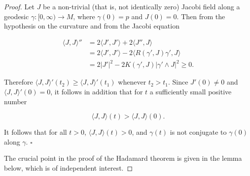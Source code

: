 \begin{proof}
  Let $J$ be a non-trivial (that is, not identically zero) Jacobi field
  along a geodesic $\gamma:[0,\infty)\to M$, where $\gamma(0)=p$ and $J(0)=0$. Then
  from the hypothesis on the curvature and from the Jacobi equation
  
  $$
  \begin{aligned}
  \langle J,J\rangle''&=2\langle J',J'\rangle+2\langle J'',J\rangle\\
  &=2\langle J',J'\rangle-2\langle R(\gamma',J)\gamma',J\rangle\\
  &=2|J'|^2-2K(\gamma',J)|\gamma'\wedge J|^2\ge 0.
  \end{aligned}
  $$
  
  Therefore $\langle J,J\rangle'(t_2)\ge\langle J,J\rangle'(t_1)$ whenever
  $t_2>t_1$. Since $J'(0)\ne 0$ and $\langle J,J\rangle'(0)=0$, it follows in
  addition that for $t$ a sufficiently small positive number
  
  $$
  \langle J,J\rangle(t)>\langle J,J\rangle(0).
  $$
  
  It follows that for all $t>0$, $\langle J,J\rangle(t)>0$, and $\gamma(t)$ is not
  conjugate to $\gamma(0)$ along $\gamma$. $\square$
  
  The crucial point in the proof of the Hadamard theorem is given in the lemma
  below, which is of independent interest.
\end{proof}

